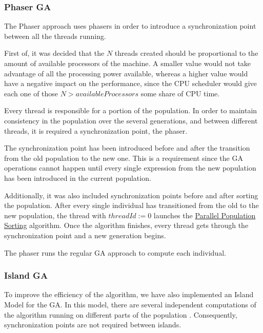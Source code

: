 \documentclass[runningheads]{llncs}
\begin{document}
\subsubsection{Phaser GA} \hfill \par

The Phaser approach uses phasers in order to introduce a synchronization point between all the threads running.

First of, it was decided that the \(N\) threads created should be proportional to the amount of available processors of the machine. A smaller value would not take advantage of all the processing power available, whereas a higher value would have a negative impact on the performance, since the CPU scheduler would give each one of those \(N > availableProcessors\) some share of CPU time.

Every thread is responsible for a portion of the population. In order to maintain consistency in the population over the several generations, and between different threads, it is required a synchronization point, the phaser. 

The synchronization point has been introduced before and after the transition from the old population to the new one. This is a requirement since the GA operations cannot happen until every single expression from the new population has been introduced in the current population.

Additionally, it was also included synchronization points before and after sorting the population. After every single individual has transitioned from the old to the new population, the thread with \(threadId := 0\) launches the \hyperref[subsubsec:parallelSort]{Parallel Population Sorting} algorithm. Once the algorithm finishes, every thread gets through the synchronization point and a new generation begins.

The phaser runs the regular GA approach to compute each individual.

\subsubsection{Island GA} \hfill \par
To improve the efficiency of the algorithm, we have also implemented an Island Model for the GA. In this model, there are several independent computations of the algorithm running on different parts of the population \cite{islandModelGA}. Consequently, synchronization points are not required between islands.
\end{document}
